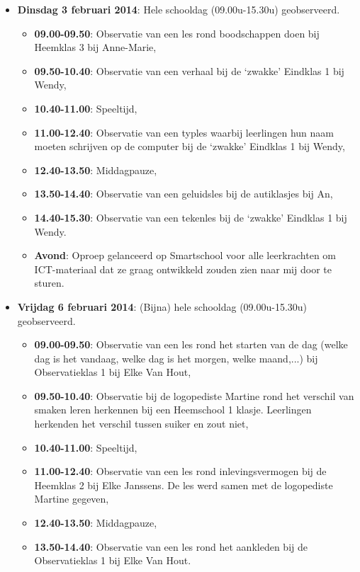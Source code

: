\documentclass[a4paper,11pt]{article}
\theoremstyle{definition}
\begin{document}
\begin{itemize}
  \item \textbf{Dinsdag 3 februari 2014}: Hele schooldag (09.00u-15.30u) 
  geobserveerd.
    \begin{itemize}
    \item \textbf{09.00-09.50}:   Observatie van een les rond boodschappen doen bij Heemklas 3 bij Anne-Marie,
    \item \textbf{09.50-10.40}:   Observatie van een verhaal bij de `zwakke' Eindklas 1 bij Wendy,
    \item \textbf{10.40-11.00}:   Speeltijd,
     \item \textbf{11.00-12.40}:  Observatie van een typles waarbij leerlingen hun naam moeten schrijven op de computer bij de `zwakke' Eindklas 1 bij Wendy,
    \item \textbf{12.40-13.50}:   Middagpauze,
    \item \textbf{13.50-14.40}:   Observatie van een geluidsles bij de autiklasjes bij An,
    \item \textbf{14.40-15.30}:   Observatie van een tekenles bij de `zwakke' Eindklas 1 bij Wendy. 
    \item \textbf{Avond}: Oproep gelanceerd op Smartschool voor alle 
    leerkrachten om ICT-materiaal dat ze graag ontwikkeld zouden zien naar mij 
    door te sturen.
  \end{itemize}
  \item \textbf{Vrijdag 6 februari 2014}: (Bijna) hele schooldag (09.00u-15.30u) 
  geobserveerd.
    \begin{itemize}
    \item \textbf{09.00-09.50}:   Observatie van een les rond het starten van de dag (welke dag is het vandaag, welke dag is het morgen, welke maand,...) bij Observatieklas 1 bij Elke Van Hout,
    \item \textbf{09.50-10.40}:   Observatie bij de logopediste Martine rond het verschil van smaken leren herkennen bij een Heemschool 1 klasje. Leerlingen herkenden het verschil tussen suiker en zout niet, 
    \item \textbf{10.40-11.00}:   Speeltijd,
    \item \textbf{11.00-12.40}:   Observatie van een les rond inlevingsvermogen bij de Heemklas 2 bij Elke Janssens. De les werd samen met de logopediste Martine gegeven,
    \item \textbf{12.40-13.50}:   Middagpauze,
    \item \textbf{13.50-14.40}:   Observatie van een les rond het aankleden bij de Observatieklas 1 bij Elke Van Hout.  \end{itemize}
 \end{itemize}
\end{document}
